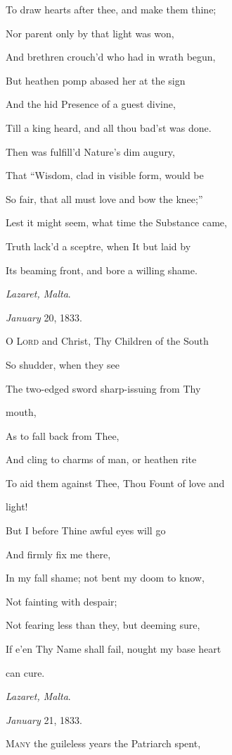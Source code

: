 To draw hearts after thee, and make them thine;

Nor parent only by that light was won,

And brethren crouch'd who had in wrath begun,

But heathen pomp abased her at the sign

And the hid Presence of a guest divine,

Till a king heard, and all thou bad'st was done.

Then was fulfill'd Nature's dim augury,

That ``Wisdom, clad in visible form, would be

So fair, that all must love and bow the knee;''

Lest it might seem, what time the Substance came,

Truth lack'd a sceptre, when It but laid by

Its beaming front, and bore a willing shame.

\emph{Lazaret, Malta}.

\emph{January} 20, 1833.


O L\textsc{ord} and Christ, Thy Children of the South

So shudder, when they see

The two-edged sword sharp-issuing from Thy

mouth,

As to fall back from Thee,

And cling to charms of man, or heathen rite

To aid them against Thee, Thou Fount of love and

light!

But I before Thine awful eyes will go

And firmly fix me there,

In my fall shame; not bent my doom to know,

Not fainting with despair;

Not fearing less than they, but deeming sure,

If e'en Thy Name shall fail, nought my base heart

can cure.

\emph{Lazaret, Malta}.

\emph{January} 21, 1833.


M\textsc{any} the guileless years the Patriarch spent,

